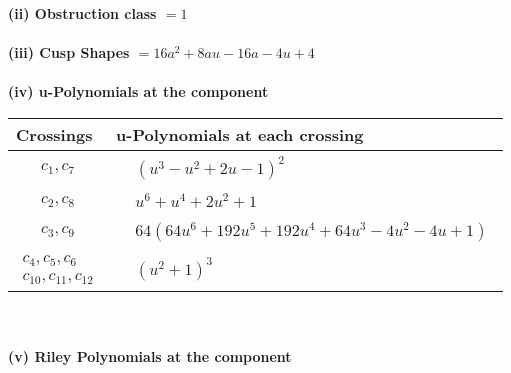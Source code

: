 \documentclass[1p]{elsarticle_modified}
\theoremstyle{definition}
\begin{document}
\flushleft \textbf{(ii) Obstruction class $= 1$}\\~\\
\flushleft \textbf{(iii) Cusp Shapes $= 16 a^2+8 a u-16 a-4 u+4$}\\~\\
\newpage\renewcommand{\arraystretch}{1}
\flushleft \textbf{(iv) u-Polynomials at the component}\newline \\
\begin{tabular}{m{50pt}|m{274pt}}
Crossings & \hspace{64pt}u-Polynomials at each crossing \\
\hline $$\begin{aligned}c_{1},c_{7}\end{aligned}$$&$\begin{aligned}
&(u^3- u^2+2 u-1)^2
\end{aligned}$\\
\hline $$\begin{aligned}c_{2},c_{8}\end{aligned}$$&$\begin{aligned}
&u^6+u^4+2 u^2+1
\end{aligned}$\\
\hline $$\begin{aligned}c_{3},c_{9}\end{aligned}$$&$\begin{aligned}
&64(64 u^6+192 u^5+192 u^4+64 u^3-4 u^2-4 u+1)
\end{aligned}$\\
\hline $$\begin{aligned}c_{4},c_{5},c_{6}\\c_{10},c_{11},c_{12}\end{aligned}$$&$\begin{aligned}
&(u^2+1)^3
\end{aligned}$\\
\hline
\end{tabular}\\~\\
\newpage\renewcommand{\arraystretch}{1}
\flushleft \textbf{(v) Riley Polynomials at the component}\newline \\
\end{document}
